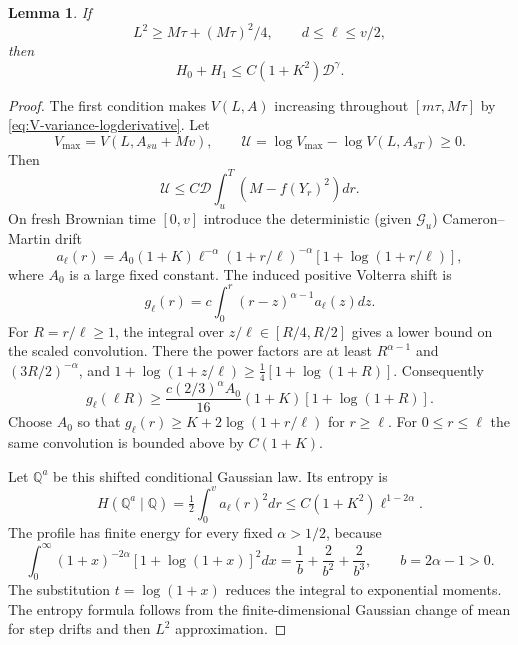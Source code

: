 \documentclass[11pt,a4paper]{amsart}
\theoremstyle{plain}
\newtheorem{lemma}[theorem]{Lemma}
\theoremstyle{definition}
\theoremstyle{remark}
\newcommand{\QQ}{\mathbb{Q}}
\newcommand{\G}{\mathcal G}
\begin{document}
\begin{lemma}\label{lem:two-entropies}
If
\begin{equation}\label{eq:increasing-regime}
 L^2\ge M\tau+(M\tau)^2/4,\qquad
 d\le\ell\le v/2,
\end{equation}
then
\begin{equation}\label{eq:entropy-bound}
 H_0+H_1\le C(1+K^2)\mathscr D^\gamma.
\end{equation}
\end{lemma}
\begin{proof}
The first condition makes $V(L,A)$ increasing throughout $[m\tau,M\tau]$ by \eqref{eq:V-variance-logderivative}. Let
\[
 V_{\max}=V(L,A_{su}+Mv),\qquad
 \mathcal U=\log V_{\max}-\log V(L,A_{sT})\ge0.
\]
Then
\begin{equation}\label{eq:variance-deficit}
 \mathcal U\le C\mathscr D\int_u^T(M-f(Y_r)^2)dr.
\end{equation}
On fresh Brownian time $[0,v]$ introduce the deterministic (given $\G_u$) Cameron--Martin drift
\begin{equation}\label{eq:shift-drift}
 a_\ell(r)=A_0(1+K)\ell^{-\alpha}(1+r/\ell)^{-\alpha}
                              [1+\log(1+r/\ell)],
\end{equation}
where $A_0$ is a large fixed constant. The induced positive Volterra shift is
\[
 g_\ell(r)=c\int_0^r(r-z)^{\alpha-1}a_\ell(z)dz.
\]
For $R=r/\ell\ge1$, the integral over $z/\ell\in[R/4,R/2]$ gives a lower bound on the scaled convolution. There the power factors are at least $R^{\alpha-1}$ and $(3R/2)^{-\alpha}$, and
$1+\log(1+z/\ell)\ge\tfrac14[1+\log(1+R)]$. Consequently
\begin{equation}\label{eq:shift-positive}
 g_\ell(\ell R)\ge\frac{c(2/3)^\alpha A_0}{16}
                        (1+K)[1+\log(1+R)].
\end{equation}
Choose $A_0$ so that $g_\ell(r)\ge K+2\log(1+r/\ell)$ for $r\ge\ell$. For $0\le r\le\ell$ the same convolution is bounded above by $C(1+K)$.

Let $\QQ^a$ be this shifted conditional Gaussian law. Its entropy is
\begin{equation}\label{eq:shift-energy}
 H(\QQ^a\mid\QQ)=\tfrac12\int_0^v a_\ell(r)^2dr
          \le C(1+K^2)\ell^{1-2\alpha}.
\end{equation}
The profile has finite energy for every fixed $\alpha>1/2$, because
\begin{equation}\label{eq:profile-integral}
 \int_0^\infty(1+x)^{-2\alpha}[1+\log(1+x)]^2dx
 =\frac1b+\frac2{b^2}+\frac2{b^3},\qquad b=2\alpha-1>0.
\end{equation}
The substitution $t=\log(1+x)$ reduces the integral to exponential moments. The entropy formula follows from the finite-dimensional Gaussian change of mean for step drifts and then $L^2$ approximation.


\end{proof}
\end{document}
